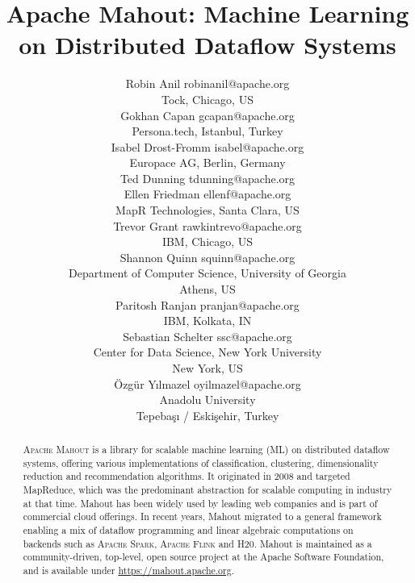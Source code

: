 \documentclass[twoside,11pt]{article}
\begin{document}
\title{Apache Mahout: Machine Learning on Distributed Dataflow Systems}

\author{\name Robin Anil \email robinanil@apache.org\\
  \addr Tock, Chicago, US\\
  \name Gokhan Capan \email gcapan@apache.org\\
  \addr Persona.tech, Istanbul, Turkey\\
  \name Isabel Drost-Fromm \email isabel@apache.org\\
  \addr Europace AG, Berlin, Germany\\
  \name Ted Dunning \email tdunning@apache.org\\
  \name Ellen Friedman \email ellenf@apache.org\\
  \addr MapR Technologies, Santa Clara, US\\
  \name Trevor Grant \email rawkintrevo@apache.org\\
  \addr IBM, Chicago, US\\
  \name Shannon Quinn \email squinn@apache.org\\
  \addr Department of Computer Science, University of Georgia\\
  \addr Athens, US\\ 
  \name Paritosh Ranjan \email pranjan@apache.org\\
  \addr IBM, Kolkata, IN\\
  \name Sebastian Schelter \email ssc@apache.org\\
  \addr Center for Data Science, New York University\\
  \addr New York, US\\
  \name Özgür Yılmazel \email oyilmazel@apache.org\\
  \addr Anadolu University\\
  \addr Tepebaşı / Eskişehir, Turkey\\
}

\editor{}

\maketitle

\begin{abstract}%
\textsc{Apache Mahout} is a library for scalable machine learning (ML) on distributed dataflow systems, offering various implementations of classification, clustering, dimensionality reduction and recommendation algorithms. It originated in 2008 and targeted MapReduce, which was the predominant abstraction for scalable computing in industry at that time. Mahout has been widely used by leading web companies and is part of commercial cloud offerings. In recent years, Mahout migrated to a general framework enabling a mix of dataflow programming and linear algebraic computations on backends such as \textsc{Apache Spark}, \textsc{Apache Flink} and \textsc{H20}. Mahout is maintained as a community-driven, top-level, open source project at the Apache Software Foundation, and is available under \url{https://mahout.apache.org}. 
\end{abstract}
\end{document}
